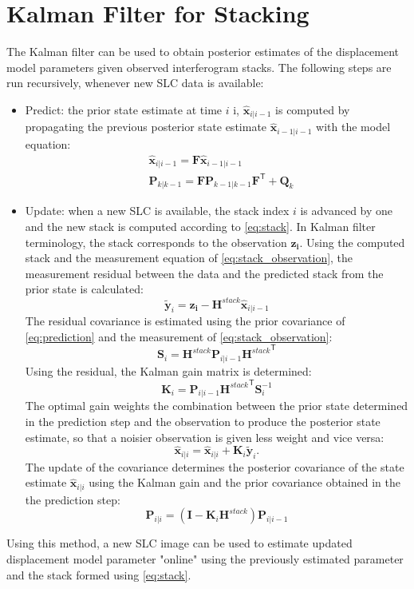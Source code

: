 \documentclass{article}
\newcommand\state[3]{{#1}_{#2\vert#3}}
\begin{document}
\section{Kalman Filter for Stacking}
The Kalman filter can be used to obtain posterior estimates of the displacement model parameters given  observed interferogram stacks. The following steps are run recursively, whenever new SLC data is available:
\begin{itemize}
	\item Predict: the prior state estimate at time $i$ i, $\state{\mathbf{\hat{x}}}{i}{i-1}$ is computed by propagating the  previous posterior state estimate $\state{\mathbf{\hat{x}}}{i-1}{i-1}$ with the model equation:
	\begin{align}\label{eq:prediction}
		&\state{\mathbf{\hat{x}}}{i}{i-1} = \mathbf{F} \state{\mathbf{\hat{x}}}{i-1}{i-1}\\
		&\state{\mathbf{P}}{k}{k-1} = \mathbf{F} \state{\mathbf{P}}{k-1}{k-1} \mathbf{F}^\mathsf{T} + \mathbf{Q}_{k}
	\end{align}
	\item Update: when a new SLC is available, the stack index $i$ is advanced by one and the new stack is computed according to \autoref{eq:stack}. In Kalman filter terminology, the stack corresponds to the observation $\mathbf{z_i}$. Using the computed stack and the measurement equation of \autoref{eq:stack_observation}, the measurement residual  between the data and the predicted stack from the prior state is calculated:
	\begin{equation}
		\tilde{\mathbf{y}}_i = \mathbf{z_i} - \mathbf{H}^{stack} \state{\mathbf{\hat{x}}}{i}{i-1}
	\end{equation}
	The residual covariance is estimated using the prior covariance of \autoref{eq:prediction}  and the measurement of \autoref{eq:stack_observation}:
	\begin{equation}
		\mathbf{S}_i = \mathbf{H}^{stack} \state{\mathbf{P}}{i}{i-1}{\mathbf{H}^{stack}}^\mathsf{T}
	\end{equation}
	Using the residual, the Kalman gain matrix is determined:
	\begin{equation}
		\mathbf{K}_i = \state{\mathbf{P}}{i}{i-1}{\mathbf{H}^{stack}}^\mathsf{T}\mathbf{S}_i^{-1}
	\end{equation}
	The optimal gain weights the  combination between the prior state determined in the prediction step and the observation to produce the posterior state estimate, so that 
	a noisier observation is given less weight and vice versa:
	\begin{equation}
		\state{\mathbf{\hat{x}}}{i}{i} = \state{\mathbf{\hat{x}}}{i}{i} + \mathbf{K}_i \tilde{\mathbf{y}}_i.
	\end{equation}
	The update of the covariance determines the posterior covariance of the state estimate $\state{\mathbf{\hat{x}}}{i}{i}$ using the Kalman gain and the prior covariance obtained in the the prediction step:
	\begin{equation}
	\state{\mathbf{P}}{i}{i} = \left(\mathbf{I} - \mathbf{K}_i\mathbf{H}^{stack}\right)\state{\mathbf{P}}{i}{i-1}
	\end{equation}
\end{itemize}
Using this method, a new SLC image can be used to estimate updated displacement model parameter "online" using the previously estimated parameter and the stack formed using \autoref{eq:stack}.
\end{document}
